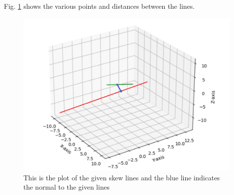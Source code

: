 \begin{enumerate}[label=\thesection.\arabic*.,ref=\thesection.\theenumi]
%
Fig.     \ref{fig:pseudo_Skew_lines} shows the various points and distances between the lines.
\begin{figure}[!ht]
\centering
    \includegraphics[width=\columnwidth]{./figs/pseudo/assignment2.jpg}
    \caption{This is the plot of the given skew lines and the blue line indicates the normal to the given lines}
    \label{fig:pseudo_Skew_lines}
\end{figure}


\end{enumerate}
